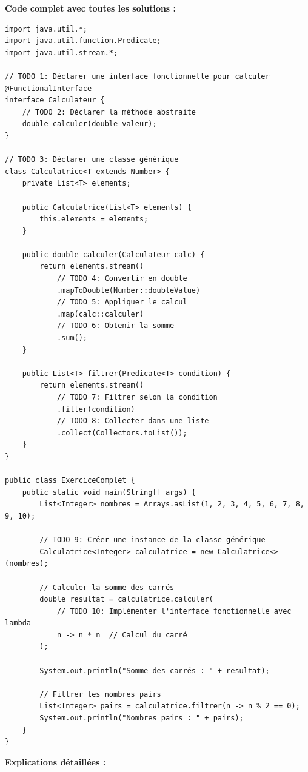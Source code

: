\documentclass[11pt,a4paper]{article}
\begin{document}
\begin{correctionbox}
\textbf{Code complet avec toutes les solutions :}

\begin{lstlisting}
import java.util.*;
import java.util.function.Predicate;
import java.util.stream.*;

// TODO 1: Déclarer une interface fonctionnelle pour calculer
@FunctionalInterface
interface Calculateur {
    // TODO 2: Déclarer la méthode abstraite
    double calculer(double valeur);
}

// TODO 3: Déclarer une classe générique
class Calculatrice<T extends Number> {
    private List<T> elements;
    
    public Calculatrice(List<T> elements) {
        this.elements = elements;
    }
    
    public double calculer(Calculateur calc) {
        return elements.stream()
            // TODO 4: Convertir en double
            .mapToDouble(Number::doubleValue)
            // TODO 5: Appliquer le calcul
            .map(calc::calculer)
            // TODO 6: Obtenir la somme
            .sum();
    }
    
    public List<T> filtrer(Predicate<T> condition) {
        return elements.stream()
            // TODO 7: Filtrer selon la condition
            .filter(condition)
            // TODO 8: Collecter dans une liste
            .collect(Collectors.toList());
    }
}

public class ExerciceComplet {
    public static void main(String[] args) {
        List<Integer> nombres = Arrays.asList(1, 2, 3, 4, 5, 6, 7, 8, 9, 10);
        
        // TODO 9: Créer une instance de la classe générique
        Calculatrice<Integer> calculatrice = new Calculatrice<>(nombres);
        
        // Calculer la somme des carrés
        double resultat = calculatrice.calculer(
            // TODO 10: Implémenter l'interface fonctionnelle avec lambda
            n -> n * n  // Calcul du carré
        );
        
        System.out.println("Somme des carrés : " + resultat);
        
        // Filtrer les nombres pairs
        List<Integer> pairs = calculatrice.filtrer(n -> n % 2 == 0);
        System.out.println("Nombres pairs : " + pairs);
    }
}
\end{lstlisting}

\textbf{Explications détaillées :}


\end{correctionbox}
\end{document}
